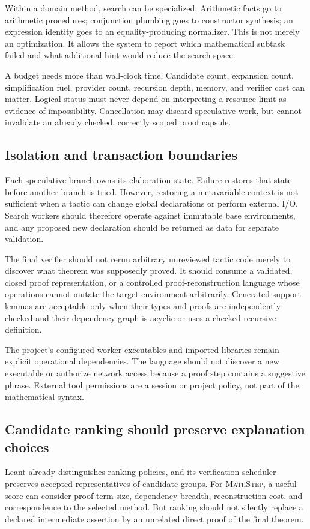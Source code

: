 \documentclass[11pt,a4paper]{article}
\theoremstyle{remark}
\newcommand{\ms}{\textsc{MathStep}}
\begin{document}
Within a domain method, search can be specialized. Arithmetic facts go to arithmetic procedures; conjunction plumbing goes to constructor synthesis; an expression identity goes to an equality-producing normalizer. This is not merely an optimization. It allows the system to report which mathematical subtask failed and what additional hint would reduce the search space.

A budget needs more than wall-clock time. Candidate count, expansion count, simplification fuel, provider count, recursion depth, memory, and verifier cost can matter. Logical status must never depend on interpreting a resource limit as evidence of impossibility. Cancellation may discard speculative work, but cannot invalidate an already checked, correctly scoped proof capsule.

\subsection{Isolation and transaction boundaries}
Each speculative branch owns its elaboration state. Failure restores that state before another branch is tried. However, restoring a metavariable context is not sufficient when a tactic can change global declarations or perform external I/O. Search workers should therefore operate against immutable base environments, and any proposed new declaration should be returned as data for separate validation.

The final verifier should not rerun arbitrary unreviewed tactic code merely to discover what theorem was supposedly proved. It should consume a validated, closed proof representation, or a controlled proof-reconstruction language whose operations cannot mutate the target environment arbitrarily. Generated support lemmas are acceptable only when their types and proofs are independently checked and their dependency graph is acyclic or uses a checked recursive definition.

The project's configured worker executables and imported libraries remain explicit operational dependencies. The language should not discover a new executable or authorize network access because a proof step contains a suggestive phrase. External tool permissions are a session or project policy, not part of the mathematical syntax.

\subsection{Candidate ranking should preserve explanation choices}
Leant already distinguishes ranking policies, and its verification scheduler preserves accepted representatives of candidate groups.\cite{leant-readme,leant-verification} For \ms, a useful score can consider proof-term size, dependency breadth, reconstruction cost, and correspondence to the selected method. But ranking should not silently replace a declared intermediate assertion by an unrelated direct proof of the final theorem.
\end{document}
